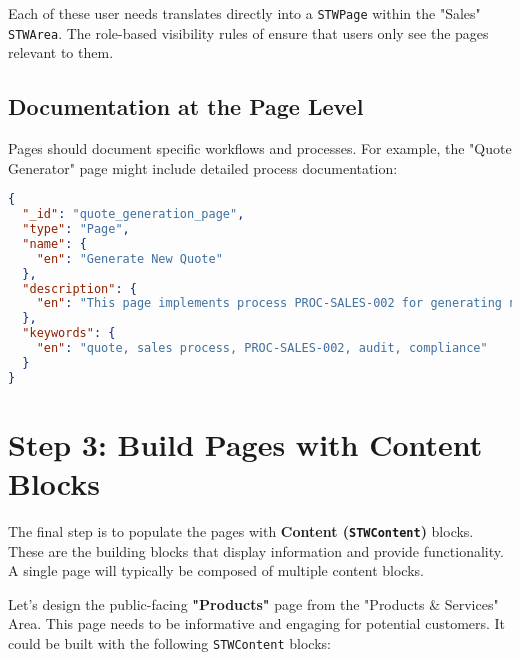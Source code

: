 Each of these user needs translates directly into a \texttt{STWPage} within the "Sales" \texttt{STWArea}. The role-based visibility rules of \wbdl{} ensure that users only see the pages relevant to them.

\subsection{Documentation at the Page Level}
\label{sec:page-documentation}

Pages should document specific workflows and processes. For example, the "Quote Generator" page might include detailed process documentation:

\begin{lstlisting}[language=JSON,caption={Page with Process Documentation},label={lst:process-page-docs}]
{
  "_id": "quote_generation_page",
  "type": "Page",
  "name": {
    "en": "Generate New Quote"
  },
  "description": {
    "en": "This page implements process PROC-SALES-002 for generating new customer quotes. The process requires completion of the customer information form and selection of products from the official catalog. All generated quotes must be approved by a sales manager before being sent to the customer. This process is audited quarterly under audit procedure AUD-Q-004."
  },
  "keywords": {
    "en": "quote, sales process, PROC-SALES-002, audit, compliance"
  }
}
\end{lstlisting}

\section{Step 3: Build Pages with Content Blocks}
\label{sec:build-with-content}

The final step is to populate the pages with \textbf{Content (\texttt{STWContent})} blocks. These are the building blocks that display information and provide functionality. A single page will typically be composed of multiple content blocks.

Let's design the public-facing \textbf{"Products"} page from the "Products \& Services" Area. This page needs to be informative and engaging for potential customers. It could be built with the following \texttt{STWContent} blocks:

